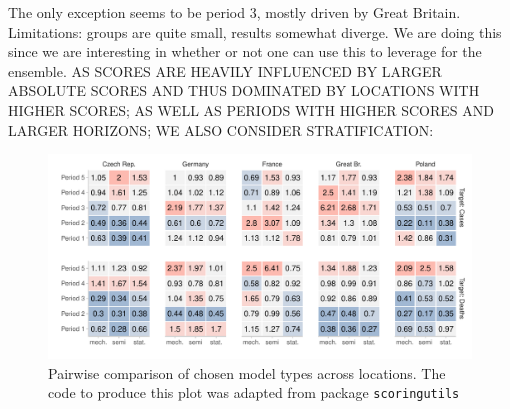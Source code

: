 The only exception seems to be period 3, mostly driven by Great Britain.\\ 
Limitations: groups are quite small, results somewhat diverge. We are doing this since we are interesting in whether or not one can use this to leverage for the ensemble.
AS SCORES ARE HEAVILY INFLUENCED BY LARGER ABSOLUTE SCORES AND THUS DOMINATED BY LOCATIONS WITH HIGHER SCORES; AS WELL AS PERIODS WITH HIGHER SCORES AND LARGER HORIZONS; WE ALSO CONSIDER STRATIFICATION:
\begin{figure}
\centering
\includegraphics[width = \textwidth]{../plots/pw_comp_model_types_across_periods_and_loc_wide.pdf}
\caption{Pairwise comparison of chosen model types across locations. The code to produce this plot was adapted from package \texttt{scoringutils}}
\label{fig:pw_comp_modeltypes_byloc}
\end{figure}
